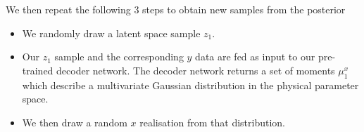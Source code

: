 \documentclass[%
showpacs,
 amsmath,amssymb,
 aps,
 twocolumn,
 prl,
 reprint,
floatfix,
]{revtex4-1}
\newcommand{\chris}[1]{\textbf{\textcolor{red}{CHRIS: #1}}}
\begin{document}
We then repeat the following 3 steps to
obtain new samples from the posterior

%
\begin{itemize}
%
\item We randomly draw a latent space sample $z_1$.
%
\item Our $z_1$ sample and the corresponding $y$ data are fed as input to our
pre-trained decoder network. The decoder network returns a set of moments
$\mu^{x}_1$ which describe a multivariate Gaussian distribution in the physical
parameter space.
%
\item We then draw a random $x$ realisation from that distribution.
%
\end{itemize}
%



\end{document}
